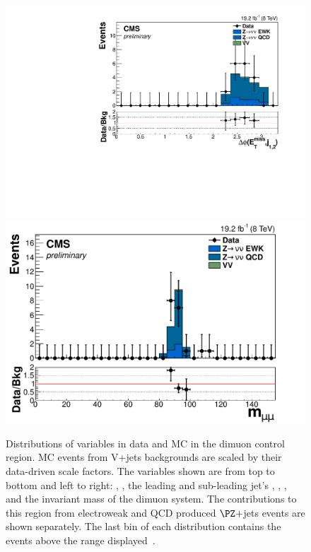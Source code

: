 \begin{figure}
  \includegraphics[width=.65\largefigwidth]{plots/parked/HIG-14-038-figs/output_sigreg/mumu_jetmetnomu_mindphi.pdf}
  \includegraphics[width=.65\largefigwidth]{plots/parked/HIG-14-038-figs/output_sigreg/mumu_m_mumu.pdf}
  \caption[Distributions of variables in data and MC in the dimuon control region. MC events from V+jets backgrounds are scaled by their data-driven scale factors. The variables shown are from top to bottom and left to right: \detajj, \Mjj, the leading and sub-leading jet's \pt, \METnoMU, \METsig, \jetmetdphileading and the invariant mass of the dimuon system. The contributions to this region from electroweak and QCD produced $\PZ+$jets events are shown separately. The last bin of each distribution contains the events above the range displayed.]{Distributions of variables in data and MC in the dimuon control region. MC events from V+jets backgrounds are scaled by their data-driven scale factors. The variables shown are from top to bottom and left to right: \detajj, \Mjj, the leading and sub-leading jet's \pt, \METnoMU, \METsig, \jetmetdphileading and the invariant mass of the dimuon system. The contributions to this region from electroweak and QCD produced $\PZ+$jets events are shown separately. The last bin of each distribution contains the events above the range displayed~\cite{CMS-PAS-HIG-14-038}.}
  \label{fig:parkedznunu}
\end{figure}

